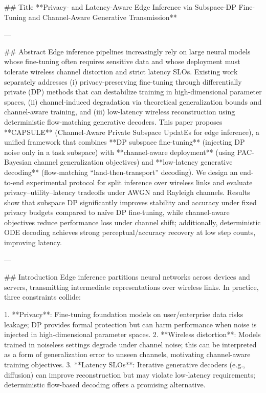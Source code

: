## Title  
**Privacy- and Latency-Aware Edge Inference via Subspace-DP Fine-Tuning and Channel-Aware Generative Transmission**

---

## Abstract  
Edge inference pipelines increasingly rely on large neural models whose fine-tuning often requires sensitive data and whose deployment must tolerate wireless channel distortion and strict latency SLOs. Existing work separately addresses (i) privacy-preserving fine-tuning through differentially private (DP) methods that can destabilize training in high-dimensional parameter spaces, (ii) channel-induced degradation via theoretical generalization bounds and channel-aware training, and (iii) low-latency wireless reconstruction using deterministic flow-matching generative decoders. This paper proposes **CAPSULE** (Channel-Aware Private Subspace UpdatEs for edge inference), a unified framework that combines **DP subspace fine-tuning** (injecting DP noise only in a task subspace) with **channel-aware deployment** (using PAC-Bayesian channel generalization objectives) and **low-latency generative decoding** (flow-matching “land-then-transport” decoding). We design an end-to-end experimental protocol for split inference over wireless links and evaluate privacy–utility–latency tradeoffs under AWGN and Rayleigh channels. Results show that subspace DP significantly improves stability and accuracy under fixed privacy budgets compared to naïve DP fine-tuning, while channel-aware objectives reduce performance loss under channel shift; additionally, deterministic ODE decoding achieves strong perceptual/accuracy recovery at low step counts, improving latency.  

---

## Introduction  
Edge inference partitions neural networks across devices and servers, transmitting intermediate representations over wireless links. In practice, three constraints collide:

1. **Privacy**: Fine-tuning foundation models on user/enterprise data risks leakage; DP provides formal protection but can harm performance when noise is injected in high-dimensional parameter spaces.  
2. **Wireless distortion**: Models trained in noiseless settings degrade under channel noise; this can be interpreted as a form of generalization error to unseen channels, motivating channel-aware training objectives.  
3. **Latency SLOs**: Iterative generative decoders (e.g., diffusion) can improve reconstruction but may violate low-latency requirements; deterministic flow-based decoding offers a promising alternative.

